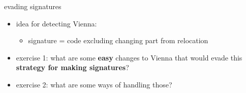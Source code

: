 \begin{frame}{evading signatures}
    \begin{itemize}
    \item idea for detecting Vienna:
        \begin{itemize}
        \item signature = code excluding changing part from relocation
        \end{itemize}
    \item exercise 1: what are some \textbf{easy} changes to Vienna
        that would evade this \textbf{strategy for making signatures}?
    \item exercise 2: what are some ways of handling those?
    \end{itemize}
\end{frame}
